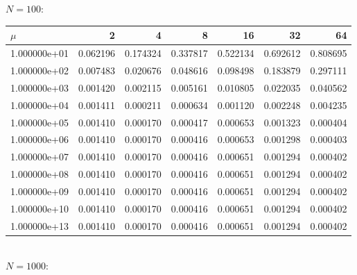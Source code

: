 \documentclass[11pt,a4paper]{report}
\begin{document}
\\
\\
$N=100$:
\\
\begin{tabular}{lrrrrrr}
\toprule
{} $\mu$&        2  &        4  &        8  &        16 &        32 &        64 \\
\midrule
1.000000e+01 &  0.062196 &  0.174324 &  0.337817 &  0.522134 &  0.692612 &  0.808695 \\
1.000000e+02 &  0.007483 &  0.020676 &  0.048616 &  0.098498 &  0.183879 &  0.297111 \\
1.000000e+03 &  0.001420 &  0.002115 &  0.005161 &  0.010805 &  0.022035 &  0.040562 \\
1.000000e+04 &  0.001411 &  0.000211 &  0.000634 &  0.001120 &  0.002248 &  0.004235 \\
1.000000e+05 &  0.001410 &  0.000170 &  0.000417 &  0.000653 &  0.001323 &  0.000404 \\
1.000000e+06 &  0.001410 &  0.000170 &  0.000416 &  0.000653 &  0.001298 &  0.000403 \\
1.000000e+07 &  0.001410 &  0.000170 &  0.000416 &  0.000651 &  0.001294 &  0.000402 \\
1.000000e+08 &  0.001410 &  0.000170 &  0.000416 &  0.000651 &  0.001294 &  0.000402 \\
1.000000e+09 &  0.001410 &  0.000170 &  0.000416 &  0.000651 &  0.001294 &  0.000402 \\
1.000000e+10 &  0.001410 &  0.000170 &  0.000416 &  0.000651 &  0.001294 &  0.000402 \\
1.000000e+13 &  0.001410 &  0.000170 &  0.000416 &  0.000651 &  0.001294 &  0.000402 \\
\bottomrule
\end{tabular}
\\
$N=1000$:
\\
\end{document}
